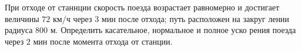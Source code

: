 При отходе от станнции скорость поезда возрастает равномерно и достигает 
величины $72$ км/ч через $3$ мин после отхода; путь расположен на закруг
лении радиуса $800$ м. Определить касательное, нормальное и полное уско
рения поезда через $2$ мин после момента отхода от станции.
